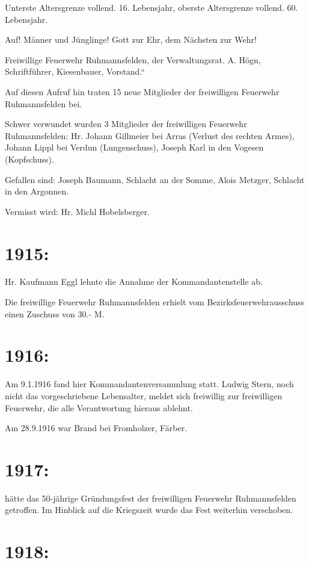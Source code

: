 \documentclass[12pt,a4paper]{book}
\begin{document}
Unterste Altersgrenze vollend. 16. Lebensjahr, oberste Altersgrenze vollend. 60.
Lebensjahr.

Auf! Männer und Jünglinge! Gott zur Ehr, dem Nächsten zur Wehr!

Freiwillige Feuerwehr Ruhmannsfelden, der Verwaltungsrat. A. Högn,
Schriftführer, Kiesenbauer, Vorstand.“

Auf diesen Aufruf hin traten 15 neue Mitglieder der freiwilligen Feuerwehr
Ruhmannsfelden bei.

Schwer verwundet wurden 3 Mitglieder der freiwilligen Feuerwehr Ruhmannsfelden:
Hr. Johann Gillmeier bei Arras (Verlust des rechten Armes), Johann Lippl bei
Verdun (Lungenschuss), Joseph Karl in den Vogesen (Kopfschuss).

Gefallen sind: Joseph Baumann, Schlacht an der Somme, Alois Metzger, Schlacht in
den Argonnen.

Vermisst wird: Hr. Michl Hobelsberger.

\section{1915:}

Hr. Kaufmann Eggl lehnte die Annahme der Kommandantenstelle ab.

Die freiwillige Feuerwehr Ruhmannsfelden erhielt vom Bezirksfeuerwehrausschuss
einen Zuschuss von 30.- M.

\section{1916:}

Am 9.1.1916 fand hier Kommandantenversammlung statt. Ludwig Stern, noch nicht
das vorgeschriebene Lebensalter, meldet sich freiwillig zur freiwilligen
Feuerwehr, die alle Verantwortung hieraus ablehnt.

Am 28.9.1916 war Brand bei Fromholzer, Färber.

\section{1917:}

hätte das 50-jährige Gründungsfest der freiwilligen Feuerwehr Ruhmannsfelden
getroffen. Im Hinblick auf die Kriegszeit wurde das Fest weiterhin verschoben.

\section{1918:}
\end{document}
